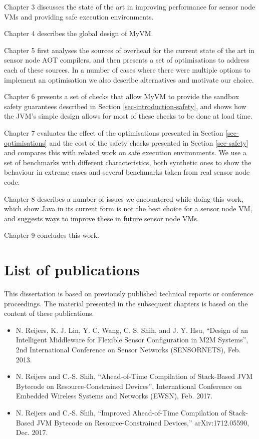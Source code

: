 Chapter 3 discusses the state of the art in improving performance for sensor node VMs and providing safe execution environments.

Chapter 4 describes the global design of MyVM.

Chapter 5 first analyses the sources of overhead for the current state of the art in sensor node AOT compilers, and then presents a set of optimisations to address each of these sources. In a number of cases where there were multiple options to implement an optimisation we also describe alternatives and motivate our choice.

Chapter 6 presents a set of checks that allow MyVM to provide the sandbox safety guarantees described in Section \ref{sec-introduction-safety}, and shows how the JVM's simple design allows for most of these checks to be done at load time.

Chapter 7 evaluates the effect of the optimisations presented in Section \ref{sec-optimisations} and the cost of the safety checks presented in Section \ref{sec-safety} and compares this with related work on safe execution environments. We use a set of benchmarks with different characteristics, both synthetic ones to show the behaviour in extreme cases and several benchmarks taken from real sensor node code.

Chapter 8 describes a number of issues we encountered while doing this work, which show Java in its current form is not the best choice for a sensor node VM, and suggests ways to improve these in future sensor node VMs.

Chapter 9 concludes this work.

\section{List of publications}
This dissertation is based on previously published technical reports or conference proceedings. The material presented in the subsequent chapters is based on the content of these publications.

\begin{itemize}
	\item N. Reijers, K. J. Lin, Y. C. Wang, C. S. Shih, and J. Y. Hsu, “Design of an Intelligent Middleware for Flexible Sensor Configuration in M2M Systems”, 2nd International Conference on Sensor Networks (SENSORNETS), Feb. 2013.
	\item N. Reijers and C.-S. Shih, “Ahead-of-Time Compilation of Stack-Based JVM Bytecode on Resource-Constrained Devices”, International Conference on Embedded Wireless Systems and Networks (EWSN), Feb. 2017.
	\item N. Reijers and C.-S. Shih, “Improved Ahead-of-Time Compilation of Stack-Based JVM Bytecode on Resource-Constrained Devices,” arXiv:1712.05590, Dec. 2017.
\end{itemize}

